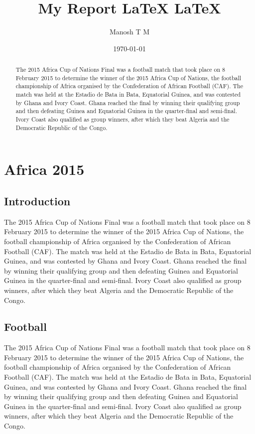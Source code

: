 \documentclass[11pt,a4]{report}
\title{My Report LaTeX \LaTeX}
\author{Manosh T M}
\date{\today}
\begin{document}
\maketitle
\tableofcontents
\listoffigures
\listoftables




\begin{abstract}
	The 2015 Africa Cup of Nations Final was a football match that took place on 8 February 2015 to determine the winner of the 2015 Africa Cup of Nations, the football championship of Africa organised by the Confederation of African Football (CAF). The match was held at the Estadio de Bata in Bata, Equatorial Guinea, and was contested by Ghana and Ivory Coast. Ghana reached the final by winning their qualifying group and then defeating Guinea and Equatorial Guinea in the quarter-final and semi-final. Ivory Coast also qualified as group winners, after which they beat Algeria and the Democratic Republic of the Congo.
\end{abstract}


\chapter{Africa 2015}
\section{Introduction}
The 2015 Africa Cup of Nations Final was a football match that took place on 8 February 2015 to determine the winner of the 2015 Africa Cup of Nations, the football championship of Africa organised by the Confederation of African Football (CAF). The match was held at the Estadio de Bata in Bata, Equatorial Guinea, and was contested by Ghana and Ivory Coast. Ghana reached the final by winning their qualifying group and then defeating Guinea and Equatorial Guinea in the quarter-final and semi-final. Ivory Coast also qualified as group winners, after which they beat Algeria and the Democratic Republic of the Congo.

\section*{Football}
The 2015 Africa Cup of Nations Final was a football match that took place on 8 February 2015 to determine the winner of the 2015 Africa Cup of Nations, the football championship of Africa organised by the Confederation of African Football (CAF). The match was held at the Estadio de Bata in Bata, Equatorial Guinea, and was contested by Ghana and Ivory Coast. Ghana reached the final by winning their qualifying group and then defeating Guinea and Equatorial Guinea in the quarter-final and semi-final. Ivory Coast also qualified as group winners, after which they beat Algeria and the Democratic Republic of the Congo.
\end{document}
